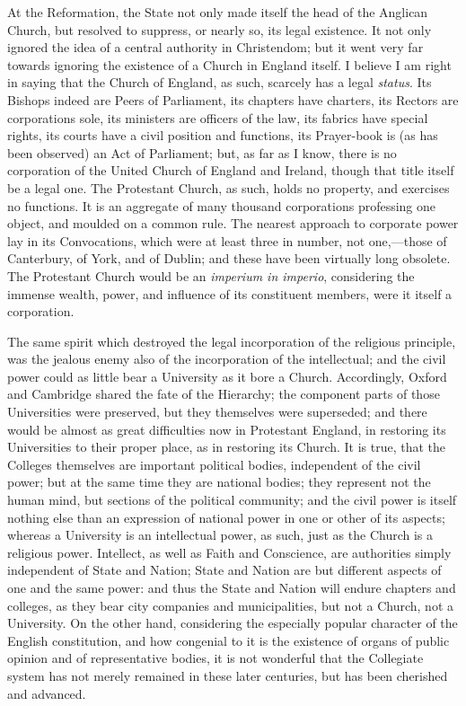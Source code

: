 At the Reformation, the State
not only made itself the head of the Anglican Church, but resolved to
suppress, or nearly so, its legal existence. It not only ignored the
idea of a central authority in Christendom; but it went very far
towards ignoring the existence of a Church in England itself. I
believe I am right in saying that the Church of England, as such,
scarcely has a legal \emph{status}. Its Bishops indeed are Peers
of Parliament, its chapters have charters, its Rectors are
corporations sole, its ministers are officers of the law, its fabrics
have special rights, its courts have a civil position and functions,
its Prayer-book is (as has been observed) an Act of Parliament; but,
as far as I know, there is no corporation of the United Church of
England and Ireland, though that title itself be a legal one. The
Protestant Church, as such, holds no property, and exercises no
functions. It is an aggregate of many thousand corporations professing
one object, and moulded on a common rule. The nearest approach to
corporate power lay in its Convocations, which were at least three in
number, not one,—those of Canterbury, of York, and of Dublin; and
these have been virtually long obsolete. The Protestant Church would
be an \emph{imperium in imperio}, considering the immense wealth,
power, and influence of its constituent members, were it itself a
corporation.

The same spirit which
destroyed the legal incorporation of the religious principle, was the
jealous enemy also of the incorporation of the intellectual; and the
civil power could as little bear a University as it bore a Church.
Accordingly, Oxford and Cambridge shared the fate of the Hierarchy;
the component parts of those Universities were preserved, but they
themselves were superseded; and there would be almost as great
difficulties now in Protestant England, in restoring its Universities
to their proper place, as in restoring its Church. It is true, that
the Colleges themselves are important political bodies, independent of
the civil power; but at the same time they are national bodies; they
represent not the human mind, but sections of the political community;
and the civil power is itself nothing else than an expression of
national power in one or other of its aspects; whereas a
University is an intellectual power, as such, just as the Church is a
religious power. Intellect, as well as Faith and Conscience, are
authorities simply independent of State and Nation; State and Nation
are but different aspects of one and the same power: and thus the
State and Nation will endure chapters and colleges, as they bear city
companies and municipalities, but not a Church, not a University. On
the other hand, considering the especially popular character of the
English constitution, and how congenial to it is the existence of
organs of public opinion and of representative bodies, it is not
wonderful that the Collegiate system has not merely remained in these
later centuries, but has been cherished and advanced.

